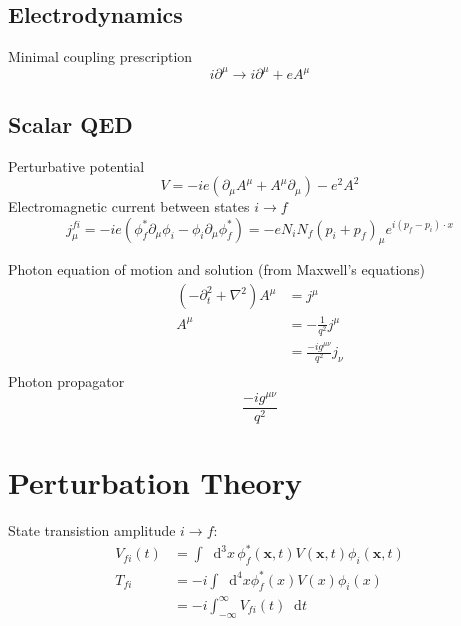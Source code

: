 \documentclass[12pt]{article}
\newcommand{\diff}{\mathop{}\!\mathrm{d}}
\theoremstyle{definition}
\begin{document}
\subsection{Electrodynamics}
Minimal coupling prescription
\begin{equation*}
    i \partial^\mu \to i \partial^\mu + e A^\mu 
\end{equation*}

\subsection{Scalar QED}
Perturbative potential
\begin{equation*}
    V = -ie(\partial_\mu A^\mu + A^\mu \partial_\mu) - e^2 A^2
\end{equation*}
Electromagnetic current between states $i \to f$
\begin{equation*}
    j^{fi}_\mu = -ie(\phi^*_f \partial_\mu \phi_i - \phi_i \partial_\mu \phi^*_f) = -e N_i N_f (p_i + p_f)_\mu e^{i(p_f - p_i) \cdot x} 
\end{equation*}

Photon equation of motion and solution (from Maxwell's equations)
\begin{equation*}
\begin{split}
    (-\partial_t^2 + \nabla^2) A^\mu &= j^\mu  \\
    A^\mu &= -\frac{1}{q^2} j^\mu \\
        &= \frac{-ig^{\mu\nu}}{q^2} j_\nu \\
\end{split}
\end{equation*}
Photon propagator
\begin{equation*}
    \frac{-i g^{\mu\nu}}{q^2}
\end{equation*}

\section{Perturbation Theory}

State transistion amplitude $i \to f$:
\begin{equation*}
\begin{split}
    V_{fi}(t) &= \int \diff^3 x \, \phi_f^*(\bm{x},t) V(\bm{x},t) \phi_i(\bm{x},t) \\
    T_{fi} &= -i \int \diff^4 x \phi^*_f(x) V(x) \phi_i(x) \\
        &= -i \int_{-\infty}^\infty V_{fi}(t) \diff t \\
\end{split}
\end{equation*}
\end{document}
